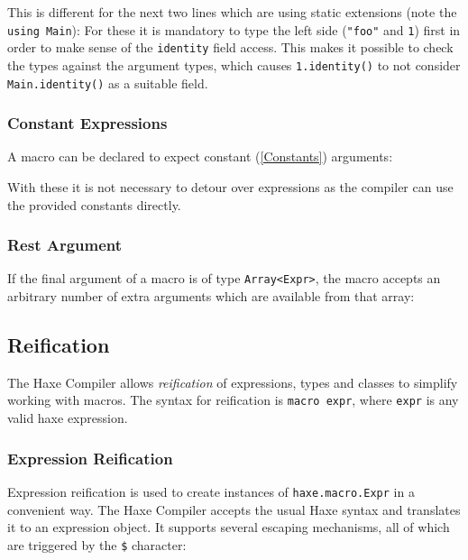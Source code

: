 \documentclass{article}
\newcommand{\type}[1]{\texttt{#1}}
\newcommand{\expr}[1]{\texttt{#1}}
\newcommand{\tref}[2]{#1 (\ref{#2})}
\begin{document}
This is different for the next two lines which are using static extensions (note the \expr{using Main}): For these it is mandatory to type the left side (\expr{"foo"} and \expr{1}) first in order to make sense of the \expr{identity} field access. This makes it possible to check the types against the argument types, which causes \expr{1.identity()} to not consider \expr{Main.identity()} as a suitable field.

\subsubsection{Constant Expressions}

A macro can be declared to expect \tref{constant}{Constants} arguments:



With these it is not necessary to detour over expressions as the compiler can use the provided constants directly.

\subsubsection{Rest Argument}

If the final argument of a macro is of type \type{Array<Expr>}, the macro accepts an arbitrary number of extra arguments which are available from that array:






\subsection{Reification}

The Haxe Compiler allows \emph{reification} of expressions, types and classes to simplify working with macros. The syntax for reification is \expr{macro expr}, where \expr{expr} is any valid haxe expression.

\subsubsection{Expression Reification}
\label{Expression Reification}

Expression reification is used to create instances of \type{haxe.macro.Expr} in a convenient way. The Haxe Compiler accepts the usual Haxe syntax and translates it to an expression object. It supports several escaping mechanisms, all of which are triggered by the \expr{\$} character:
\end{document}
